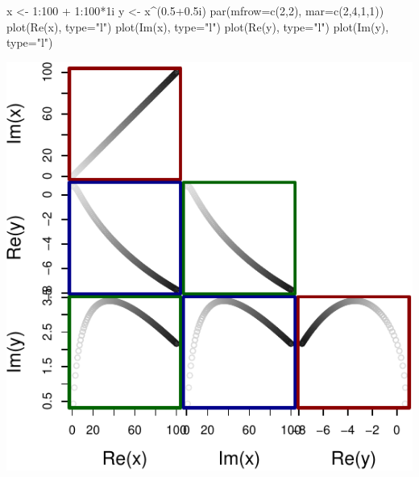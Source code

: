\documentclass[
]{book}
\newenvironment{Shaded}{\begin{snugshade}}{\end{snugshade}}
\newcommand{\AttributeTok}[1]{\textcolor[rgb]{0.77,0.63,0.00}{#1}}
\newcommand{\DecValTok}[1]{\textcolor[rgb]{0.00,0.00,0.81}{#1}}
\newcommand{\FloatTok}[1]{\textcolor[rgb]{0.00,0.00,0.81}{#1}}
\newcommand{\FunctionTok}[1]{\textcolor[rgb]{0.00,0.00,0.00}{#1}}
\newcommand{\NormalTok}[1]{#1}
\newcommand{\OtherTok}[1]{\textcolor[rgb]{0.56,0.35,0.01}{#1}}
\newcommand{\SpecialCharTok}[1]{\textcolor[rgb]{0.00,0.00,0.00}{#1}}
\newcommand{\StringTok}[1]{\textcolor[rgb]{0.31,0.60,0.02}{#1}}
\begin{document}
\begin{Shaded}
\begin{Highlighting}[]
\NormalTok{x }\OtherTok{\textless{}{-}} \DecValTok{1}\SpecialCharTok{:}\DecValTok{100} \SpecialCharTok{+} \DecValTok{1}\SpecialCharTok{:}\DecValTok{100}\SpecialCharTok{*}\NormalTok{1i}
\NormalTok{y }\OtherTok{\textless{}{-}}\NormalTok{ x}\SpecialCharTok{\^{}}\NormalTok{(}\FloatTok{0.5+0.5}\NormalTok{i)}
\FunctionTok{par}\NormalTok{(}\AttributeTok{mfrow=}\FunctionTok{c}\NormalTok{(}\DecValTok{2}\NormalTok{,}\DecValTok{2}\NormalTok{), }\AttributeTok{mar=}\FunctionTok{c}\NormalTok{(}\DecValTok{2}\NormalTok{,}\DecValTok{4}\NormalTok{,}\DecValTok{1}\NormalTok{,}\DecValTok{1}\NormalTok{))}
\FunctionTok{plot}\NormalTok{(}\FunctionTok{Re}\NormalTok{(x), }\AttributeTok{type=}\StringTok{"l"}\NormalTok{)}
\FunctionTok{plot}\NormalTok{(}\FunctionTok{Im}\NormalTok{(x), }\AttributeTok{type=}\StringTok{"l"}\NormalTok{)}
\FunctionTok{plot}\NormalTok{(}\FunctionTok{Re}\NormalTok{(y), }\AttributeTok{type=}\StringTok{"l"}\NormalTok{)}
\FunctionTok{plot}\NormalTok{(}\FunctionTok{Im}\NormalTok{(y), }\AttributeTok{type=}\StringTok{"l"}\NormalTok{)}
\end{Highlighting}
\end{Shaded}

\includegraphics{Svetunkov---Svetunkov---Complex-Dynamic-Models_files/figure-latex/unnamed-chunk-25-1.pdf}
\end{document}
